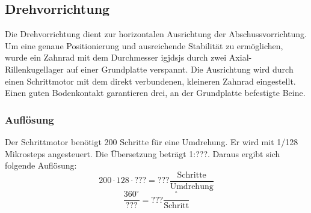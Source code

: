 \subsection{Drehvorrichtung}
Die Drehvorrichtung dient zur horizontalen Ausrichtung der 
Abschussvorrichtung. Um eine genaue Positionierung und ausreichende Stabilität 
zu ermöglichen, wurde ein Zahnrad mit dem Durchmesser igjdsjs durch zwei 
Axial-Rillenkugellager auf einer Grundplatte verspannt. Die Ausrichtung wird 
durch einen Schrittmotor mit dem direkt verbundenen, kleineren Zahnrad 
eingestellt. Einen guten Bodenkontakt garantieren drei, an der Grundplatte 
befestigte Beine.

\subsubsection{Auflösung}
Der Schrittmotor benötigt 200 Schritte für eine Umdrehung. Er wird mit 1/128 
Mikrosteps angesteuert. Die Übersetzung beträgt 1:???. Daraus ergibt sich 
folgende Auflösung: 
\[ 200 \cdot 128 \cdot ??? = ??? \frac{\text{Schritte}}{\text{Umdrehung}}  \]
\[ \frac{360^\circ}{???} = ??? \frac{^\circ}{\text{Schritt}} \]
